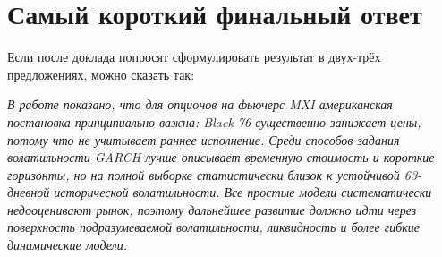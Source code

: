 \documentclass[11pt,a4paper]{article}
\begin{document}
\section{Самый короткий финальный ответ}

Если после доклада попросят сформулировать результат в двух-трёх предложениях, можно сказать так:

\textit{В работе показано, что для опционов на фьючерс MXI американская постановка принципиально важна: Black-76 существенно занижает цены, потому что не учитывает раннее исполнение. Среди способов задания волатильности GARCH лучше описывает временную стоимость и короткие горизонты, но на полной выборке статистически близок к устойчивой 63-дневной исторической волатильности. Все простые модели систематически недооценивают рынок, поэтому дальнейшее развитие должно идти через поверхность подразумеваемой волатильности, ликвидность и более гибкие динамические модели.}
\end{document}

